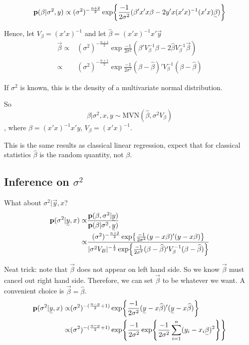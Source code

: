 \[
\p(\beta| \sigma^2, y) \propto (\sigma^2)^{-\frac{n+2}{2}} \exp{\frac{-1}{2\sigma^2} (\beta' x' x \beta - 2y'x(x'x)^{-1} (x'x)\vec{\beta})}
\]

Hence, let $V_\beta = (x'x)^{-1}$ and let $\hat \beta = (x'x)^{-1}x'\vec{y}$
\begin{align*}
    \vec{\beta} 
    \propto& 
    (\sigma^2)^{-\frac{n+1}{2}} \exp{\frac{-1}{2\sigma^2} (\beta' V_\beta^{-1} \beta - 2\hat{\beta}V_\beta^{-1} \vec{\beta})}\\
    \propto&
    (\sigma^2)^{-\frac{n+1}{2}} \exp{\frac{-1}{2\sigma^2} (\beta - \hat{\beta})' V_{\beta}^{-1} (\beta - \hat{\beta})} 
\end{align*}

If $\sigma^2$ is known, this is the density of a multivariate normal distribution.

So 
\[
\beta| \sigma^2, x, y \sim \text{MVN}(\hat{\beta}, \sigma^2 V_\beta)
\]
, where $\hat \beta = (x'x)^{-1}x'y$, $V_\beta = (x'x)^{-1}$.

This is the same results as classical linear regression, expect that for classical statistics $\hat \beta$ is the random quantity, not $\beta$.

\subsection{Inference on $\sigma^2$}
What about $\sigma^2| \vec{y}, x$?
\begin{align*}
    \p(\sigma^2| \vec{y}, x)
    \propto&
    \frac{\p(\beta, \sigma^2|\vec{y})}{\p(\beta| \sigma^2, \vec{y})}\\
    \propto&
    \frac
    {(\sigma^2)^{-\frac{n+2}{2}} \exp{\frac{-1}{2\sigma^2} (y-x\beta)'(y-x\beta)}}
    {|\sigma^2 V_B|^{-\frac{1}{2}} \exp{\frac{-1}{2\sigma^2} (\beta - \hat \beta)'V_\beta^{-1}(\beta - \hat \beta)}}
\end{align*}

Neat trick: note that $\vec{\beta}$ does not appear on left hand side. So we know $\vec{\beta}$ must cancel out right hand side. Therefore, we can set $\vec{\beta}$ to be whatever we want. A convenient choice is $\vec{\beta} = \hat{\beta}$.
\begin{align*}
    \p(\sigma^2| \vec{y}, x)
    \propto& 
    (\sigma^2)^{-(\frac{n-p}{2} + 1)} \exp{\frac{-1}{2\sigma^2} (\vec{y} - x\hat{\beta})' (\vec{y}-x\hat{\beta})}\\
    \propto&
    (\sigma^2)^{-(\frac{n-p}{2} + 1)} \exp{\frac{-1}{2\sigma^2} \exp{\frac{-1}{2\sigma^2} \sum_{i=1}^n (y_i - x_i\vec{\beta})^2}} 
\end{align*}

